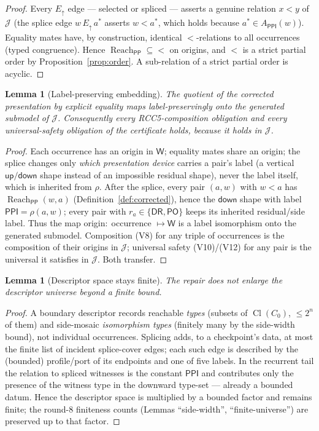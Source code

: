 \documentclass[11pt]{article}
\newtheorem{lemma}[theorem]{Lemma}
\newcommand{\DR}{\mathsf{DR}}
\newcommand{\PO}{\mathsf{PO}}
\newcommand{\PP}{\mathsf{PP}}
\newcommand{\PPI}{\mathsf{PPI}}
\newcommand{\Cl}{\operatorname{Cl}}
\newcommand{\reach}{\operatorname{Reach}}
\newcommand{\Eup}{E_{\uparrow}}
\newcommand{\up}{\mathsf{up}}
\newcommand{\down}{\mathsf{down}}
\newcommand{\W}{\mathsf W}
\newcommand{\J}{\mathcal J}
\begin{document}
\begin{proof}
Every $\Eup$ edge --- selected or spliced --- asserts a genuine relation $x<y$
of $\J$ (the splice edge $w\,\Eup\,a^\ast$ asserts $w<a^\ast$, which holds
because $a^\ast\in A_\PPI(w)$).  Equality mates have, by construction, identical
$<$-relations to all occurrences (typed congruence).  Hence
$\reach_\PP\subseteq{<}$ on origins, and ${<}$ is a strict partial order by
Proposition~\ref{prop:order}.  A sub-relation of a strict partial order is
acyclic.
\end{proof}

\begin{lemma}[Label-preserving embedding]\label{lem:embed}
The quotient of the corrected presentation by explicit equality maps
label-preservingly onto the generated submodel of $\J$.  Consequently every
RCC5-composition obligation and every universal-safety obligation of the
certificate holds, because it holds in $\J$.
\end{lemma}

\begin{proof}
Each occurrence has an origin in $\W$; equality mates share an origin; the
splice changes only \emph{which presentation device} carries a pair's label
(a vertical $\up/\down$ shape instead of an impossible residual shape), never
the label itself, which is inherited from $\rho$.  After the splice, every pair
$(a,w)$ with $w<a$ has $\reach_\PP(w,a)$ (Definition~\ref{def:corrected}), hence
the $\down$ shape with label $\PPI=\rho(a,w)$; every pair with $r_a\in\{\DR,\PO\}$
keeps its inherited residual/side label.  Thus the map origin$:\;$occurrence
$\mapsto\W$ is a label isomorphism onto the generated submodel.  Composition
(V8) for any triple of occurrences is the composition of their origins in $\J$;
universal safety (V10)/(V12) for any pair is the universal it satisfies in $\J$.
Both transfer.
\end{proof}

\begin{lemma}[Descriptor space stays finite]\label{lem:desc-finite}
The repair does not enlarge the descriptor universe beyond a finite bound.
\end{lemma}

\begin{proof}
A boundary descriptor records reachable \emph{types} (subsets of $\Cl(C_0)$,
$\le 2^n$ of them) and side-mosaic \emph{isomorphism types} (finitely many by
the side-width bound), not individual occurrences.  Splicing adds, to a
checkpoint's data, at most the finite list of incident splice-cover edges; each
such edge is described by the (bounded) profile/port of its endpoints and one of
five labels.  In the recurrent tail the relation to spliced witnesses is the
constant $\PPI$ and contributes only the presence of the witness type in the
downward type-set --- already a bounded datum.  Hence the descriptor space is
multiplied by a bounded factor and remains finite; the round-8 finiteness
counts (Lemmas ``side-width'', ``finite-universe'') are preserved up to that
factor.
\end{proof}
\end{document}

